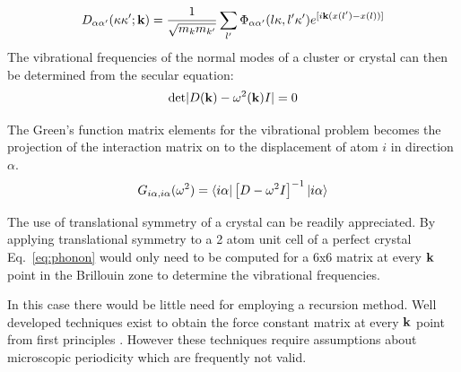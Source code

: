 \begin{equation}
D_{\alpha\alpha'}(\kappa\kappa';{\bf k}) = \frac{1}{\sqrt{m_{k}m_{k'}}} \sum_{l'} \Phi_{\alpha\alpha'}(l\kappa,l'\kappa') e^{[i{\bf k}(x(l')-x(l))]}
\end{equation}
%
The vibrational frequencies of the normal modes of a cluster or crystal can then be determined 
from the secular equation:
%
\begin{equation}
{\rm det}|D({\bf k}) - \omega^{2}({\bf k})I| = 0
\end{equation}
%

The Green's function matrix elements for the vibrational problem 
becomes the projection of the interaction matrix on to the 
displacement of atom $i$ in direction $\alpha$.
%
\begin{equation}
G_{i\alpha,i\alpha}(\omega^{2})= \langle i\alpha| \left[D- \omega^{2}I\right]^{-1} |i\alpha \rangle
\end{equation}
%

The use of translational symmetry of a crystal
can be readily appreciated. By applying translational
symmetry to a 2 atom unit cell of a perfect 
crystal Eq.~\ref{eq:phonon} would only
need to be computed for a 6x6 matrix at every ${\bf k}$ point 
in the Brillouin zone to determine the vibrational frequencies. 

In this case there would be little need for employing a recursion method.
Well developed techniques exist to obtain the force constant 
matrix at every ${\bf k}$ point from first principles \cite{baroni01}.
However these techniques require assumptions about
microscopic periodicity which are frequently  
not valid. 

